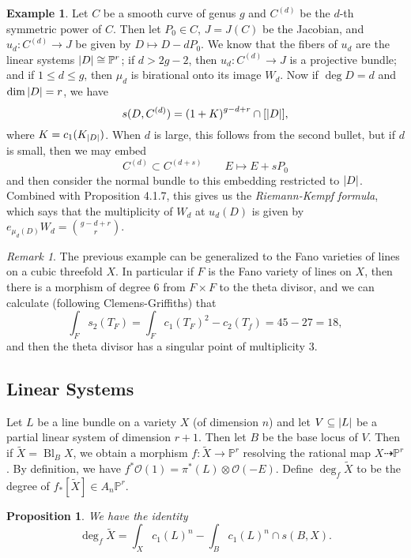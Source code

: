 \documentclass[leqno, openany]{memoir}
\newtheorem{prop}[thm]{Proposition}
\theoremstyle{definition}
\newtheorem{exm}[thm]{Example}
\theoremstyle{remark}
\newtheorem{rmk}[thm]{Remark}
\theoremstyle{plain}
\theoremstyle{definition}
\theoremstyle{remark}
\renewcommand{\P}{\mathbb{P}}
\newcommand{\msc}[1]{\mathscr{#1}}
\newcommand{\wt}[1]{\widetilde{#1}}
\DeclareMathOperator{\Bl}{Bl}
\begin{document}
\begin{exm}
    Let $C$ be a smooth curve of genus $g$ and $C^{(d)}$ be the $d$-th symmetric power of $C$. Then let $P_0 \in C$, $J = J(C)$ be the Jacobian, and $u_d \colon C^{(d)} \to J$ be given by $D \mapsto D - d P_0$. We know that the fibers of $u_d$ are the linear systems $\abs{D} \cong \P^r$; if $d > 2g-2$, then $u_d \colon C^{(d)} \to J$ is a projective bundle; and if $1 \leq d \leq g$, then $\mu_d$ is birational onto its image $W_d$.
    Now if $\deg D = d$ and $\dim \abs{D} = r$, we have
    \[ s(D, C^{(d)}) = {(1 + K)}^{g-d+r} \cap [\abs{D}], \]
    where $K = c_1(K_{\abs{D}})$. When $d$ is large, this follows from the second bullet, but if $d$ is small, then we may embed 
    \[ C^{(d)} \subset C^{(d+s)} \qquad E \mapsto E + s P_0 \]
    and then consider the normal bundle to this embedding restricted to $\abs{D}$. Combined with Proposition 4.1.7, this gives us the \textit{Riemann-Kempf formula}, which says that the multiplicity of $W_d$ at $u_d(D)$ is given by $e_{\mu_d(D)} W_d = \binom{g - d+r}{r}$.
\end{exm}

\begin{rmk}
    The previous example can be generalized to the Fano varieties of lines on a cubic threefold $X$. In particular if $F$ is the Fano variety of lines on $X$, then there is a morphism of degree $6$ from $F \times F$ to the theta divisor, and we can calculate (following Clemens-Griffiths) that
    \[ \int_F s_2(T_F) = \int_F {c_1(T_F)}^2 - c_2(T_f) = 45 - 27 = 18, \]
    and then the theta divisor has a singular point of multiplicity $3$.
\end{rmk}

\subsection{Linear Systems}%
\label{sub:linear_systems}

Let $L$ be a line bundle on a variety $X$ (of dimension $n$) and let $V \subseteq \abs{L}$ be a partial linear system of dimension $r+1$. Then let $B$ be the base locus of $V$. Then if $\wt{X} = \Bl_B X$, we obtain a morphism $f \colon \wt{X} \to \P^r$ resolving the rational map $X \dashrightarrow \P^r$. By definition, we have $f^* \msc{O}(1) = \pi^*(L) \otimes \msc{O}(-E)$. Define $\deg_f \wt{X}$ to be the degree of $f_* [\wt{X}] \in A_n \P^r$.

\begin{prop}
    We have the identity
    \[ \deg_f \wt{X} = \int_X {c_1(L)}^n - \int_B {c_1(L)}^n \cap s(B,X). \]
\end{prop}
\end{document}
